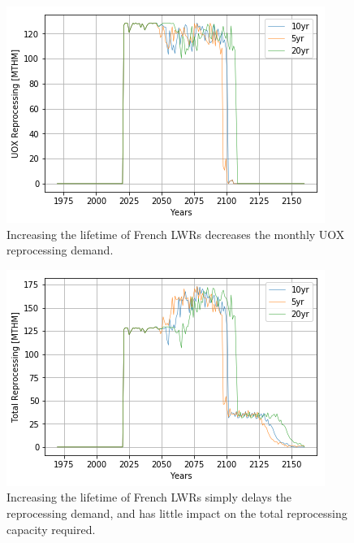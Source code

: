 \begin{figure}[htbp!]
    \begin{center}
        \includegraphics[scale=0.6]{./images/sensitivity/ext_uox_rep.png}
    \end{center}
    \caption{Increasing the lifetime of French \glspl{LWR} decreases the monthly
    \gls{UOX} reprocessing demand.}
    \label{fig:ext_uox}
\end{figure}


\begin{figure}[htbp!]
    \begin{center}
        \includegraphics[scale=0.6]{./images/sensitivity/ext_tot_rep.png}
    \end{center}
    \caption{Increasing the lifetime of French \glspl{LWR} simply delays the
             reprocessing demand, and has little impact on the total 
     reprocessing capacity required.}
    \label{fig:ext_all}
\end{figure}

